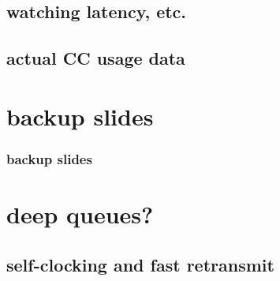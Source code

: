 \subsection{watching latency, etc.}


\subsection{actual CC usage data}






\section{backup slides}
\begin{frame}\frametitle{backup slides}
\end{frame}
\section{deep queues?}


\subsection{self-clocking and fast retransmit}



